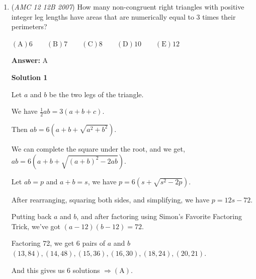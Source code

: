 \begin{enumerate}
 $D\left(\frac{3}{4}, \frac{\sqrt{3}}{4}\right).$

 The midpoint of $D$ and the $A$ is the bottom-left vertex of the smaller equilateral triangle. Using the \href{https://artofproblemsolving.com/wiki/index.php?title=Distance\_formula}{distance formula}, we get the point

 $\left(\frac{3}{8}, \frac{\sqrt{3}}{8}\right).$

 Since the smaller triangle is simply a dilation of the larger one, they both have an axis of symmetry over $x=\frac{1}{2}$. This yields the bottom-right vertex of the smaller triangle as

 $\left(\frac{5}{8}, \frac{\sqrt{3}}{8}\right).$

 Therefore the side length of the smaller triangle is $\frac{1}{4}.$ The problem asks us for the ratio of the areas, and since area is two-dimensional, we simply square the ratio to get $\frac{1}{16} \Rightarrow \boxed{\text{A}}.$



	\item (\textit{AMC 12 12B 2007}) How many non-congruent right triangles with positive integer leg lengths have areas that are numerically equal to $3$ times their perimeters?


 $\mathrm {(A)} 6\qquad \mathrm {(B)} 7\qquad \mathrm {(C)} 8\qquad \mathrm {(D)} 10\qquad \mathrm {(E)} 12$

 \textbf{Answer: }A



\textbf{Solution 1}

Let $a$ and $b$ be the two legs of the triangle.

 We have $\frac{1}{2}ab = 3(a+b+c)$.

 Then $ab=6 \left(a+b+\sqrt {a^2 + b^2}\right)$.

 We can complete the square under the root, and we get, $ab=6 \left(a+b+\sqrt {(a+b)^2 - 2ab}\right)$.

 Let $ab=p$ and $a+b=s$, we have $p=6 \left(s+ \sqrt {s^2 - 2p}\right)$.

 After rearranging, squaring both sides, and simplifying, we have $p=12s-72$.

 
Putting back $a$ and $b$, and after factoring using Simon's Favorite Factoring Trick, we've got $(a-12)(b-12)=72$.

 
Factoring 72, we get 6 pairs of $a$ and $b$
$(13, 84), (14, 48), (15, 36), (16, 30), (18, 24), (20, 21).$

 
And this gives us $6$ solutions $\Rightarrow \mathrm{(A)}$.


\end{enumerate}
